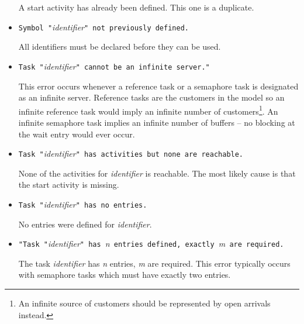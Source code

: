 \begin{itemize}
  A start activity has already been defined.
  This one is a duplicate.

\item \texttt{Symbol "}\emph{identifier}\texttt{" not previously
    defined.}
  
  All identifiers must be declared before they can be
  used.

\item \texttt{Task "}\emph{identifier}\texttt{" cannot be an
    infinite server." }
  
  This error occurs whenever a reference task or a
  semaphore task is designated as an infinite server.
  Reference tasks are the customers in the model so an infinite reference task would imply an infinite
  number of customers\footnote{An infinite source of customers should be represented by open
    arrivals instead.}.  An infinite semaphore task implies an infinite number of
  buffers -- no blocking at the wait entry would ever occur.

\item \texttt{Task "}\emph{identifier}\texttt{" has activities but
    none are reachable.}
  
  None of the activities for \emph{identifier} is reachable.  The most
  likely cause is that the start activity is
  missing.

\item \texttt{Task "}\emph{identifier}\texttt{" has no entries.}
  
  No entries were defined for \emph{identifier}.

\item \texttt{"Task "}\emph{identifier}\texttt{" has }\emph{n}\texttt{ entries defined, exactly
  }\emph{m}\texttt{ are required.}
  
  The task \emph{identifier} has \emph{n} entries, \emph{m} are required. This error typically occurs with
  semaphore tasks which must have exactly two entries.


\end{itemize}
